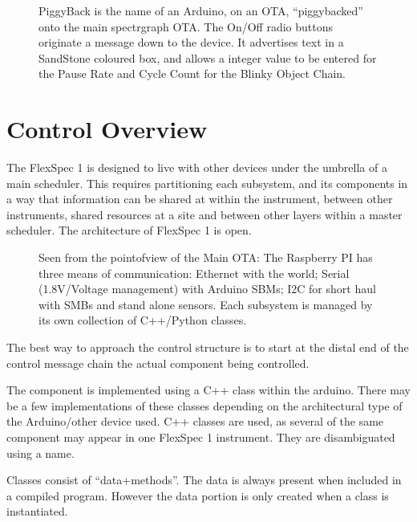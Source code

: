 \documentclass[letterpaper,10pt,english,openany,oneside]{sphinxmanual}
\begin{document}
\begin{figure}[htbp]
\centering
\capstart

\noindent{}
\caption{PiggyBack is the name of an Arduino, on an OTA, “piggybacked” onto
the main spectrgraph OTA. The On/Off radio buttons originate
a message down to the device. It advertises text in a SandStone
coloured box, and allows a integer value to be entered for the
Pause Rate and Cycle Count for the Blinky Object Chain.}\label{\detokenize{controls:id1}}\end{figure}


\section{Control Overview}
\label{\detokenize{controls:control-overview}}
\sphinxAtStartPar
The FlexSpec 1 is designed to live with other devices under the umbrella
of a main scheduler. This requires partitioning each subsystem, and its
components in a way that information can be shared at within the instrument,
between other instruments, shared resources at a site and between other
layers within a master scheduler. The architecture of FlexSpec 1 is open.

\begin{figure}[htbp]
\centering
\capstart

\noindent{}
\caption{Seen from the point\sphinxhyphen{}of\sphinxhyphen{}view of the Main OTA: The Raspberry PI has three means of communication: Ethernet with the world; Serial (1.8V/Voltage management) with Arduino SBMs; I2C for short haul with SMBs and stand alone sensors. Each sub\sphinxhyphen{}system is managed by its own collection of C++/Python classes.}\label{\detokenize{controls:id2}}\end{figure}

\sphinxAtStartPar
The best way to approach the control structure is to start at the distal
end of the control message chain \textendash{} the actual component being controlled.

\sphinxAtStartPar
The component is implemented using a C++ class within the arduino. There
may be a few implementations of these classes \textendash{} depending on the
architectural type of the Arduino/other device used. C++ classes
are used, as several of the same component may appear in one FlexSpec 1
instrument. They are disambiguated using a name.

\sphinxAtStartPar
Classes consist of “data+methods”. The data is always present when
included in a compiled program. However the data portion is only
created when a class is instantiated.
\end{document}
